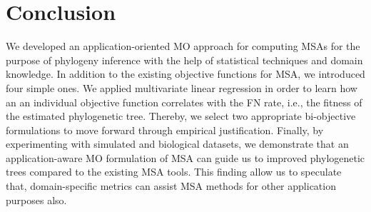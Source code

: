  \section{Conclusion} \label{sec:discussion}
We developed an application-oriented MO approach for computing MSAs for the purpose of phylogeny inference with the help of statistical techniques and domain knowledge. In addition to the existing objective functions for MSA, we introduced four simple ones. 
We applied multivariate linear regression in order to learn how an an individual objective function correlates with the FN rate, i.e., the fitness of the estimated phylogenetic tree. Thereby, we select two appropriate bi-objective formulations to move forward through empirical justification. Finally, by experimenting with simulated and biological datasets, we demonstrate that an application-aware MO formulation of MSA can guide us to improved phylogenetic trees compared to the existing MSA tools. This finding allow us to speculate that, domain-specific metrics can assist MSA methods for other application purposes also. 






